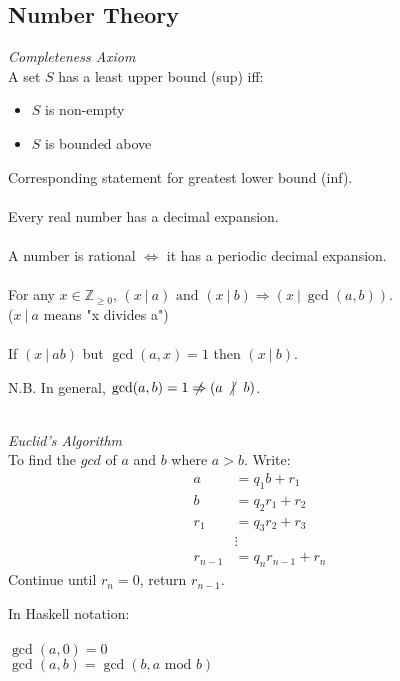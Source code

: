 \documentclass{article}
\newcommand{\Z}{\mathbb{Z}}
\begin{document}
\subsection{Number Theory}
\textit{Completeness Axiom}
\\
A set $ S $ has a least upper bound (sup) iff:
\begin{itemize}
\item $ S $ is non-empty
\item $ S $ is bounded above
\end{itemize}
Corresponding statement for greatest lower bound (inf).
\\\\
Every real number has a decimal expansion.
\\\\
A number is rational $ \Leftrightarrow $ it has a periodic decimal expansion.
\\\\
For any $ x \in \Z_{\geq 0} $, $ (x \ | \ a) \textrm{ and } (x \ | \ b) \Rightarrow (x \ | \ \gcd(a, b)) $.
\\
($ x \ | \ a  $ means "x divides a")
\\\\
If $  (x \ | \ ab) $ but $ \gcd(a, x) = 1 $ then $ (x \ | \ b ) $.
\\
\begin{tcolorbox}
N.B. In general, $ \gcd(a, b) = 1 \centernot\Rightarrow (a \ \centernot| \ b) $.
\end{tcolorbox}
\noindent
\\
\textit{Euclid's Algorithm}
\\
To find the $ gcd $ of $ a $ and $ b $ where $ a > b $. Write:
\begin{align}
a & = q_{1} b + r_{1} \\
b & = q_{2} r_{1} + r_{2} \\
r_{1} & = q_{3} r_{2} + r_{3} \\
& \vdots \\
r_{n-1} & = q_{n} r_{n-1} + r_{n}
\end{align}
Continue until $ r_{n} = 0 $, return $ r_{n-1} $.
\\
\begin{tcolorbox}
In Haskell notation:
\\\\
$ \gcd(a, 0) = 0 $
\\
$ \gcd(a, b) = \gcd(b, a \textrm{ mod } b) $
\end{tcolorbox}
\noindent
\\
\end{document}
